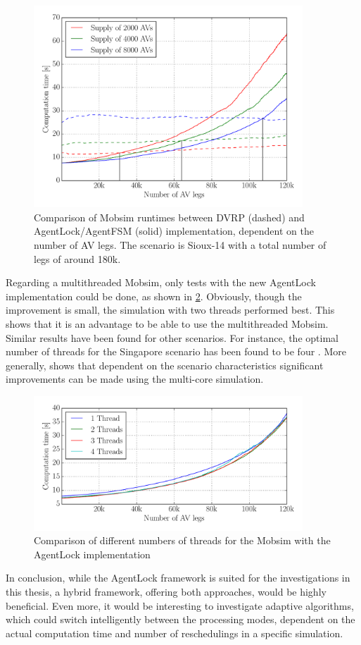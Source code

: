 \begin{figure}
    \centering
    \includegraphics[width=0.9\textwidth]{figures/dvrp_fsm.pdf}
    \caption{Comparison of Mobsim runtimes between DVRP (dashed) and AgentLock/AgentFSM (solid) implementation, dependent on the number of AV legs. The scenario is Sioux-14 with
    a total number of legs of around 180k.}
    \label{fig:dvrpfsm}
\end{figure}

Regarding a multithreaded Mobsim, only tests with the new AgentLock implementation
could be done, as shown in \cref{fig:threads}. Obviously, though the improvement
is small, the simulation with two threads performed best. This shows that it is
an advantage to be able to use the multithreaded Mobsim. Similar results
have been found for other scenarios. For instance, the optimal number of threads
for the Singapore scenario has been found to be four \citep{Erath2014}. More generally, \citet{Dobler2010}
shows that dependent on the scenario characteristics significant improvements
can be made using the multi-core simulation.

\begin{figure}
    \centering
    \includegraphics[width=0.9\textwidth]{figures/threads.pdf}
    \caption{Comparison of different numbers of threads for the Mobsim with the AgentLock implementation}
    \label{fig:threads}
\end{figure}

In conclusion, while the AgentLock framework is suited for the investigations in
this thesis, a hybrid framework, offering both approaches, would be highly beneficial.
Even more, it would be interesting
to investigate adaptive algorithms, which could switch intelligently between the
processing modes, dependent on the actual computation time and number of reschedulings
in a specific simulation.
